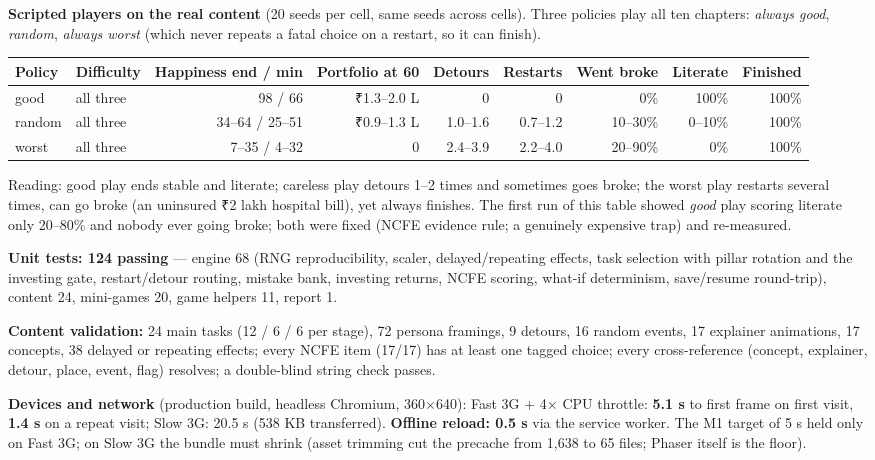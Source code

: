 \documentclass[10pt,a4paper]{article}
\newcommand{\rs}{{\rupeefont ₹}}
\begin{document}
\textbf{Scripted players on the real content} (20 seeds per cell, same seeds across cells). Three policies play all ten chapters: \emph{always good}, \emph{random}, \emph{always worst} (which never repeats a fatal choice on a restart, so it can finish).
\begin{center}\footnotesize
\begin{tabular}{@{}llrrrrrrr@{}}
\toprule
Policy & Difficulty & Happiness end / min & Portfolio at 60 & Detours & Restarts & Went broke & Literate & Finished \\
\midrule
good & all three & 98 / 66 & \rs1.3--2.0 L & 0 & 0 & 0\% & 100\% & 100\% \\
random & all three & 34--64 / 25--51 & \rs0.9--1.3 L & 1.0--1.6 & 0.7--1.2 & 10--30\% & 0--10\% & 100\% \\
worst & all three & 7--35 / 4--32 & 0 & 2.4--3.9 & 2.2--4.0 & 20--90\% & 0\% & 100\% \\
\bottomrule
\end{tabular}
\end{center}
Reading: good play ends stable and literate; careless play detours 1--2 times and sometimes goes broke; the worst play restarts several times, can go broke (an uninsured \rs2 lakh hospital bill), yet always finishes. The first run of this table showed \emph{good} play scoring literate only 20--80\% and nobody ever going broke; both were fixed (NCFE evidence rule; a genuinely expensive trap) and re-measured.

\textbf{Unit tests: 124 passing} --- engine 68 (RNG reproducibility, scaler, delayed/repeating effects, task selection with pillar rotation and the investing gate, restart/detour routing, mistake bank, investing returns, NCFE scoring, what-if determinism, save/resume round-trip), content 24, mini-games 20, game helpers 11, report 1.

\textbf{Content validation:} 24 main tasks (12 / 6 / 6 per stage), 72 persona framings, 9 detours, 16 random events, 17 explainer animations, 17 concepts, 38 delayed or repeating effects; every NCFE item (17/17) has at least one tagged choice; every cross-reference (concept, explainer, detour, place, event, flag) resolves; a double-blind string check passes.

\textbf{Devices and network} (production build, headless Chromium, 360$\times$640): Fast 3G + 4$\times$ CPU throttle: \textbf{5.1 s} to first frame on first visit, \textbf{1.4 s} on a repeat visit; Slow 3G: 20.5 s (538 KB transferred). \textbf{Offline reload: 0.5 s} via the service worker. The M1 target of 5 s held only on Fast 3G; on Slow 3G the bundle must shrink (asset trimming cut the precache from 1,638 to 65 files; Phaser itself is the floor).
\end{document}
